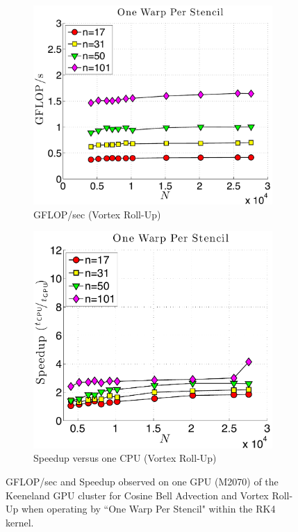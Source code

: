 \begin{figure}
\begin{subfigure}[t]{0.46\textwidth}
\includegraphics[width=\textwidth]{../figures/keeneland_results/alltoallv_vortex/gflops_gpu_1proc_oneWarpPerStencil.pdf}
\caption{GFLOP/sec (Vortex Roll-Up)}
\label{fig:gflops_gpu_1proc_oneWarp_keeneland_vortex}
\end{subfigure} 
\quad
\begin{subfigure}[t]{0.425\textwidth}
\includegraphics[width=\textwidth]{../figures/keeneland_results/alltoallv_vortex/speedup_1proc_oneWarpPerStencil.pdf}
\caption{Speedup versus one CPU (Vortex Roll-Up)}
\label{fig:speedup_1proc_oneWarp_keeneland_vortex}
\end{subfigure} 
\caption{GFLOP/sec and Speedup observed on one GPU (M2070) of the Keeneland GPU cluster for Cosine Bell Advection and Vortex Roll-Up when operating by ``One Warp Per Stencil" within the RK4 kernel.}
\end{figure} 

